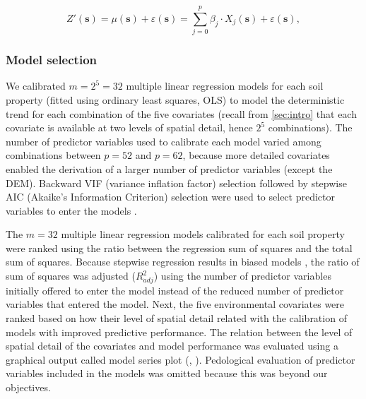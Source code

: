 \begin{equation}\label{eq:lmm}
 Z'(\textbf{s}) = \mu(\textbf{s}) + \varepsilon(\textbf{s}) = \sum_{j=0}^{p} 
 \beta_{j}\cdot X_{j}(\textbf{s}) + \varepsilon(\textbf{s}),
\end{equation}


\subsubsection*{Model selection}

We calibrated $m=2^5=32$ multiple linear regression models for each soil property
(fitted using ordinary least squares, OLS) to model the deterministic trend for 
each combination of the five covariates (recall from \autoref{sec:intro} that 
each covariate is available at two levels of spatial detail, hence $2^5$ 
combinations). The number of predictor variables used to calibrate each model 
varied among combinations between $p=52$ and $p=62$, because more detailed 
covariates enabled the derivation of a larger number of predictor variables 
(except the DEM). Backward VIF (variance inflation factor) selection followed 
by stepwise AIC (Akaike's Information Criterion) selection were used to select 
predictor variables to enter the models \citep{Samuel-RosaEtAl2014c, VenablesEtAl2002}.

The $m=32$ multiple linear regression models calibrated for each soil property 
were ranked using the ratio between the regression sum of squares and the total 
sum of squares. Because stepwise regression results in biased models 
\citep{Harrell2001a}, the ratio of sum of squares was adjusted (${R}^{2}_{adj}$)
using the number of predictor variables initially offered to enter the model 
instead of the reduced number of predictor variables that entered the model. 
Next, the five environmental covariates were ranked based on how their level of 
spatial detail related with the calibration of models with improved predictive 
performance. The relation between the level of spatial detail of the covariates 
and model performance was evaluated using a graphical output called model series
plot (, \citet{Samuel-RosaEtAl2014c}). Pedological 
evaluation of predictor variables included in the models was omitted because 
this was beyond our objectives.

